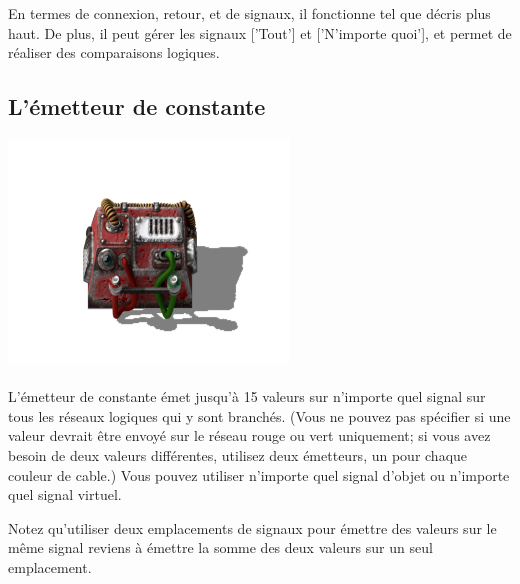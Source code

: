 En termes de connexion, retour, et de signaux, il fonctionne tel que décris plus haut. De plus, il peut gérer les signaux ['Tout'] et ['N'importe quoi'], et permet de réaliser des comparaisons logiques. 

\subsection{L'émetteur de constante}
\begin{minipage}[t]{\textwidth}


{
\centering
\includegraphics{pics/factorio-constant.png}
}

\end{minipage}

\paragraph{}
L'émetteur de constante émet jusqu'à 15 valeurs sur n'importe quel signal sur tous les réseaux logiques qui y sont branchés. 
(Vous ne pouvez pas spécifier si une valeur devrait être envoyé sur le réseau rouge ou vert uniquement; si vous avez besoin de deux valeurs différentes, utilisez deux émetteurs, un pour chaque couleur de cable.) 
Vous pouvez utiliser n'importe quel signal d'objet ou n'importe quel signal virtuel.

\begin{info}
Notez qu'utiliser deux emplacements de signaux pour émettre des valeurs sur le même signal reviens à émettre la somme des deux valeurs sur un seul emplacement.
\end{info}